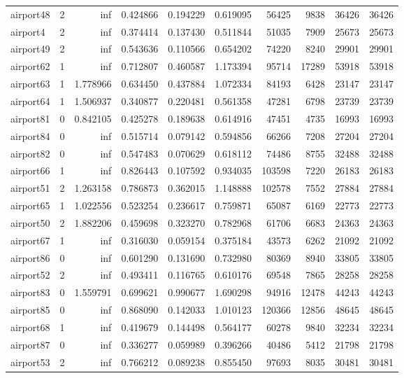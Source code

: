 \documentclass[../../../thesis.tex]{subfiles}
\begin{document}
\begin{longtable}{|l|r|r|r|r|r|r|r|r|r|}
airport48 & 2 & inf & 0.424866 & 0.194229 & 0.619095 & 56425 & 9838 & 36426 & 36426 \\
airport4 & 2 & inf & 0.374414 & 0.137430 & 0.511844 & 51035 & 7909 & 25673 & 25673 \\
airport49 & 2 & inf & 0.543636 & 0.110566 & 0.654202 & 74220 & 8240 & 29901 & 29901 \\
airport62 & 1 & inf & 0.712807 & 0.460587 & 1.173394 & 95714 & 17289 & 53918 & 53918 \\
airport63 & 1 & 1.778966 & 0.634450 & 0.437884 & 1.072334 & 84193 & 6428 & 23147 & 23147 \\
airport64 & 1 & 1.506937 & 0.340877 & 0.220481 & 0.561358 & 47281 & 6798 & 23739 & 23739 \\
airport81 & 0 & 0.842105 & 0.425278 & 0.189638 & 0.614916 & 47451 & 4735 & 16993 & 16993 \\
airport84 & 0 & inf & 0.515714 & 0.079142 & 0.594856 & 66266 & 7208 & 27204 & 27204 \\
airport82 & 0 & inf & 0.547483 & 0.070629 & 0.618112 & 74486 & 8755 & 32488 & 32488 \\
airport66 & 1 & inf & 0.826443 & 0.107592 & 0.934035 & 103598 & 7220 & 26183 & 26183 \\
airport51 & 2 & 1.263158 & 0.786873 & 0.362015 & 1.148888 & 102578 & 7552 & 27884 & 27884 \\
airport65 & 1 & 1.022556 & 0.523254 & 0.236617 & 0.759871 & 65087 & 6169 & 22773 & 22773 \\
airport50 & 2 & 1.882206 & 0.459698 & 0.323270 & 0.782968 & 61706 & 6683 & 24363 & 24363 \\
airport67 & 1 & inf & 0.316030 & 0.059154 & 0.375184 & 43573 & 6262 & 21092 & 21092 \\
airport86 & 0 & inf & 0.601290 & 0.131690 & 0.732980 & 80369 & 8940 & 33805 & 33805 \\
airport52 & 2 & inf & 0.493411 & 0.116765 & 0.610176 & 69548 & 7865 & 28258 & 28258 \\
airport83 & 0 & 1.559791 & 0.699621 & 0.990677 & 1.690298 & 94916 & 12478 & 44243 & 44243 \\
airport85 & 0 & inf & 0.868090 & 0.142033 & 1.010123 & 120366 & 12856 & 48645 & 48645 \\
airport68 & 1 & inf & 0.419679 & 0.144498 & 0.564177 & 60278 & 9840 & 32234 & 32234 \\
airport87 & 0 & inf & 0.336277 & 0.059989 & 0.396266 & 40486 & 5412 & 21798 & 21798 \\
airport53 & 2 & inf & 0.766212 & 0.089238 & 0.855450 & 97693 & 8035 & 30481 & 30481 \\

\end{longtable}
\end{document}
